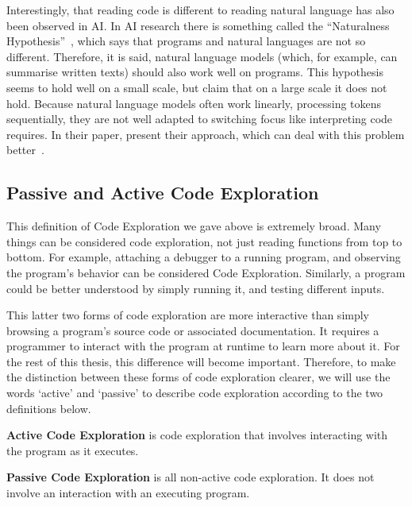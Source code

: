 Interestingly, that reading code is different to reading natural language has also been observed in \ac{AI}.
In \ac{AI} research there is something called the ``Naturalness Hypothesis''~\autocite{AllamanisBDS18}, which says that programs and natural languages are not so different.
Therefore, it is said, natural language models (which, for example, can summarise written texts) should also work well on programs.
This hypothesis seems to hold well on a small scale, but \citeauthor{Ben-NunJH18} claim that on a large scale it does not hold.
Because natural language models often work linearly, processing tokens sequentially, they are not well adapted to switching focus like interpreting code requires.
In their paper, \citeauthor{Ben-NunJH18} present their approach, which can deal with this problem better~\autocite*{Ben-NunJH18}.

\subsection{Passive and Active Code Exploration}\label{subsec:passive-and-active-code-exploration}

This definition of Code Exploration we gave above is extremely broad.
Many things can be considered code exploration, not just reading functions from top to bottom.
For example, attaching a debugger to a running program, and observing the program's behavior can be considered Code Exploration.
Similarly, a program could be better understood by simply running it, and testing different inputs.

This latter two forms of code exploration are more interactive than simply browsing a program's source code or associated documentation.
It requires a programmer to interact with the program at runtime to learn more about it.
For the rest of this thesis, this difference will become important.
Therefore, to make the distinction between these forms of code exploration clearer,
we will use the words `active' and `passive' to describe code exploration according to the two definitions below.

\begin{definition}
    \textbf{Active Code Exploration} is code exploration that involves interacting with the program as it executes.
\end{definition}
\begin{definition}
    \textbf{Passive Code Exploration} is all non-active code exploration.
    It does not involve an interaction with an executing program.
\end{definition}


